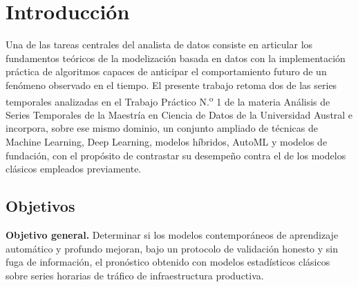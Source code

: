 \section{Introducción}

Una de las tareas centrales del analista de datos consiste en articular los fundamentos teóricos de la
modelización basada en datos con la implementación práctica de algoritmos capaces de anticipar el
comportamiento futuro de un fenómeno observado en el tiempo. El presente trabajo retoma dos de las series
temporales analizadas en el Trabajo Práctico N.\textsuperscript{o} 1 de la materia Análisis de Series
Temporales de la Maestría en Ciencia de Datos de la Universidad Austral e incorpora, sobre ese mismo
dominio, un conjunto ampliado de técnicas de Machine Learning, Deep Learning, modelos híbridos, AutoML y
modelos de fundación, con el propósito de contrastar su desempeño contra el de los modelos clásicos
empleados previamente.

\subsection{Objetivos}

\textbf{Objetivo general.} Determinar si los modelos contemporáneos de aprendizaje automático y profundo
mejoran, bajo un protocolo de validación honesto y sin fuga de información, el pronóstico obtenido con
modelos estadísticos clásicos sobre series horarias de tráfico de infraestructura productiva.

